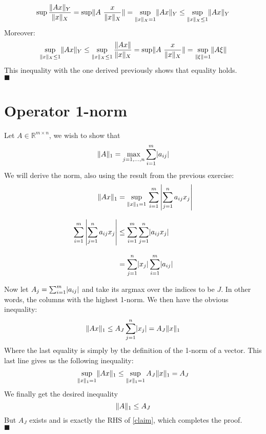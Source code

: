 \documentclass{article}
\DeclarePairedDelimiter{\abs}{\lvert}{\rvert}
\DeclarePairedDelimiter{\norm}{\lVert}{\rVert}
\begin{document}
	 \begin{equation*}
	 	\sup \frac{\norm{Ax}_Y}{\norm{x}_X} = \sup \norm{A \, \,  \frac{x}{\norm{x}_X}} = \sup_{\norm x_X = 1} \norm{Ax}_Y \leq \sup_{\norm x_X \leq 1} \norm{Ax}_Y
	 \end{equation*}
	 Moreover:
	 \begin{equation}
	 	\sup_{\norm x_X \leq 1} \norm{Ax}_Y \leq \sup_{\norm x_X \leq 1} \frac{\norm{Ax}}{\norm{x}_X} = \sup \norm{A \, \,  \frac{x}{\norm{x}_X}} = \sup_{\norm\xi = 1} \norm{A\xi }
	 \end{equation}
	 This inequality with the one derived previously shows that equality holds.\\
	 $\blacksquare$
	 
	\clearpage
	
	\section{Operator 1-norm}
	
	Let $A\in \mathbb R^{m\times n}$, we wish to show that 
	\begin{equation}\label{claim}
		\norm A_1 = \max_{j=1,\ldots, n } \sum_{i=1}^{m}\abs{a_{ij}}
	\end{equation}
	We will derive the norm, also using the result from the previous exercise:
	\begin{align}
		\norm{Ax}_1 &= \sup_{\norm x_1 = 1}  \, \sum_{i=1}^{m}\left \vert\sum_{j=1}^{n}a_{ij}x_j \right \vert\\[2ex]
	\sum_{i=1}^{m}\left \vert\sum_{j=1}^{n}a_{ij}x_j \right \vert	&\leq \sum_{i=1}^{m} \sum_{j=1}^{n} \abs{a_{ij}x_j}\\[2ex]
		&= \sum_{j=1}^{n}\abs{x_j} \sum_{i=1}^{m}\abs{a_{ij}}
	\end{align}
	
	Now let $A_j = \sum_{i=1}^{m}\abs{a_{ij}}$ and take its argmax over the indices to be $J$. In other words, the columns with the highest 1-norm. We then have the obvious inequality:
	\begin{equation}
		\norm{Ax}_1 \leq A_J\sum_{j=1}^{n} \abs{x_j} = A_J \norm{x}_1
	\end{equation}
	Where the last equality is simply by the definition of the 1-norm of a vector. This last line gives us the following inequality:
	\begin{align}
		\sup_{\norm x_1 = 1} \norm {Ax}_1 \leq \sup_{\norm x_1 = 1} A_J \norm x_1 =  A_J
	\end{align}
	We finally get the desired inequality
	\begin{equation}
		\norm{A}_1 \leq A_J
	\end{equation}
	But $A_J$ exists and is exactly the RHS of \ref{claim}, which completes the proof.\\
	$\blacksquare$
	
\end{document}
